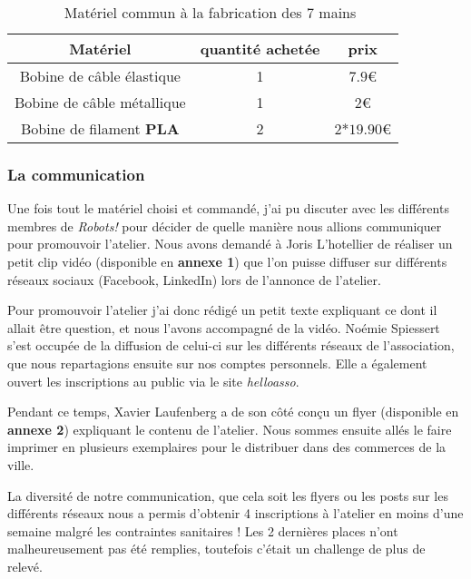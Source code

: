 \begin{table}[!h]
    \centering
    \begin{tabular}{|c|c|c|}
        \hline Matériel & quantité achetée & prix \\
        \hline Bobine de câble élastique & 1 & $7.9$\euro{} \\
        \hline Bobine de câble métallique & 1 & $2$\euro{} \\
        \hline Bobine de filament \textbf{PLA} & 2 & 2*$19.90$\euro{}\\
        \hline
    \end{tabular}
    \caption{\, \, Matériel commun à la fabrication des 7 mains}
    \label{tab_4.1.3.2}
\end{table}

\newpage

\subsubsection{La communication}

Une fois tout le matériel choisi et commandé, j'ai pu discuter avec les différents membres de \textit{Robots!} pour décider de quelle manière nous allions communiquer pour promouvoir l'atelier. Nous avons demandé à Joris L'hotellier de réaliser un petit clip vidéo (disponible en \textbf{annexe 1}) que l'on puisse diffuser sur différents réseaux sociaux (Facebook, LinkedIn) lors de l'annonce de l'atelier.

\vspace{0.5cm}
Pour promouvoir l'atelier j'ai donc rédigé un petit texte expliquant ce dont il allait être question, et nous l'avons accompagné de la vidéo. Noémie Spiessert s'est occupée de la diffusion de celui-ci sur les différents réseaux de l'association, que nous repartagions ensuite sur nos comptes personnels. Elle a également ouvert les inscriptions au public via le site \textit{helloasso}.

\vspace{0.5cm}
Pendant ce temps, Xavier Laufenberg a de son côté conçu un flyer (disponible en \textbf{annexe 2}) expliquant le contenu de l'atelier. Nous sommes ensuite allés le faire imprimer en plusieurs exemplaires pour le distribuer dans des commerces de la ville.

\vspace{0.5cm}
La diversité de notre communication, que cela soit les flyers ou les posts sur les différents réseaux nous a permis d'obtenir 4 inscriptions à l'atelier en moins d'une semaine malgré les contraintes sanitaires ! Les 2 dernières places n'ont malheureusement pas été remplies, toutefois c'était un challenge de plus de relevé.

